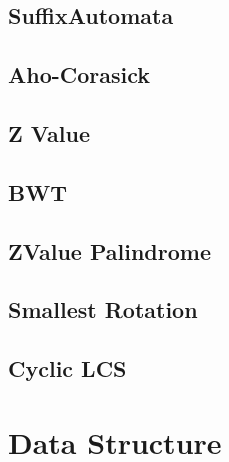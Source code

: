 \documentclass[a4paper,10pt,twocolumn,oneside]{article}
\begin{document}
\subsection{SuffixAutomata}


\subsection{Aho-Corasick}


\subsection{Z Value}


\subsection{BWT}


\subsection{ZValue Palindrome}


\subsection{Smallest Rotation}


%

\subsection{Cyclic LCS}


\section{Data Structure}

%
\end{document}
